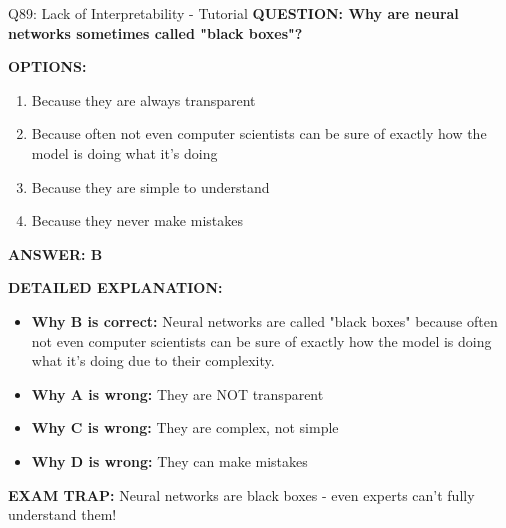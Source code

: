 \documentclass[8pt]{beamer}
\begin{document}
	\begin{frame}{Q89: Lack of Interpretability - Tutorial}
		\fontsize{6.5}{7.5}\selectfont
		\textbf{QUESTION: Why are neural networks sometimes called "black boxes"?}
		
		\vspace{0.1cm}
		\textbf{OPTIONS:}
		\begin{enumerate}
			\item Because they are always transparent
			\item Because often not even computer scientists can be sure of exactly how the model is doing what it's doing
			\item Because they are simple to understand
			\item Because they never make mistakes
		\end{enumerate}
		
		\vspace{0.1cm}
		\textcolor{myblue}{\textbf{ANSWER: B}}
		
		\vspace{0.1cm}
		\textbf{DETAILED EXPLANATION:}
		\begin{itemize}
			\item \textbf{Why B is correct:} Neural networks are called "black boxes" because often not even computer scientists can be sure of exactly how the model is doing what it's doing due to their complexity.
			\item \textbf{Why A is wrong:} They are NOT transparent
			\item \textbf{Why C is wrong:} They are complex, not simple
			\item \textbf{Why D is wrong:} They can make mistakes
		\end{itemize}
		
		\textcolor{myred}{\textbf{EXAM TRAP:}} Neural networks are \textcolor{myblue}{black boxes} - even experts can't fully understand them!
	\end{frame}
	
\end{document}
